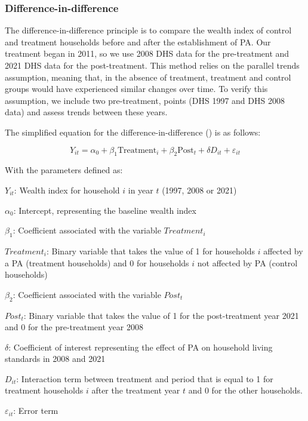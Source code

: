 \documentclass[
]{article}
\begin{document}
\subsubsection{Difference-in-difference}\label{difference-in-difference}

The difference-in-difference principle is to compare the wealth index of
control and treatment households before and after the establishment of
PA. Our treatment began in 2011, so we use 2008 DHS data for the
pre-treatment and 2021 DHS data for the post-treatment. This method
relies on the parallel trends assumption, meaning that, in the absence
of treatment, treatment and control groups would have experienced
similar changes over time. To verify this assumption, we include two
pre-treatment, points (DHS 1997 and DHS 2008 data) and assess trends
between these years.

The simplified equation for the difference-in-difference
() is as follows:

\[
Y_{it} = \alpha_0 + \beta_1 \text{Treatment}_i + \beta_2 \text{Post}_t + \delta D_{it} + \varepsilon_{it}
\]

With the parameters defined as:

\(Y_{i t}\): Wealth index for household \(i\) in year \(t\) (1997, 2008
or 2021)

\(α_0\): Intercept, representing the baseline wealth index

\(β_1\): Coefficient associated with the variable \(Treatment_i\)

\(Treatment_i\): Binary variable that takes the value of 1 for
households \(i\) affected by a PA (treatment households) and 0 for
households \(i\) not affected by PA (control households)

\(β_2\): Coefficient associated with the variable \(Post_t\)

\(Post_t\): Binary variable that takes the value of 1 for the
post-treatment year 2021 and 0 for the pre-treatment year 2008

\(δ\): Coefficient of interest representing the effect of PA on
household living standards in 2008 and 2021

\(D_{i t}\): Interaction term between treatment and period that is equal
to 1 for treatment households \(i\) after the treatment year \(t\) and 0
for the other households.

\(ε_{i t}\): Error term
\end{document}
